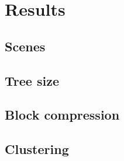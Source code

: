 \section{Results} \label{results}
\subsection{Scenes} \label{results:scenes}
\subsection{Tree size} \label{results:tree_size}
\subsection{Block compression} \label{results:block_compression}
\subsection{Clustering} \label{results:clustering}